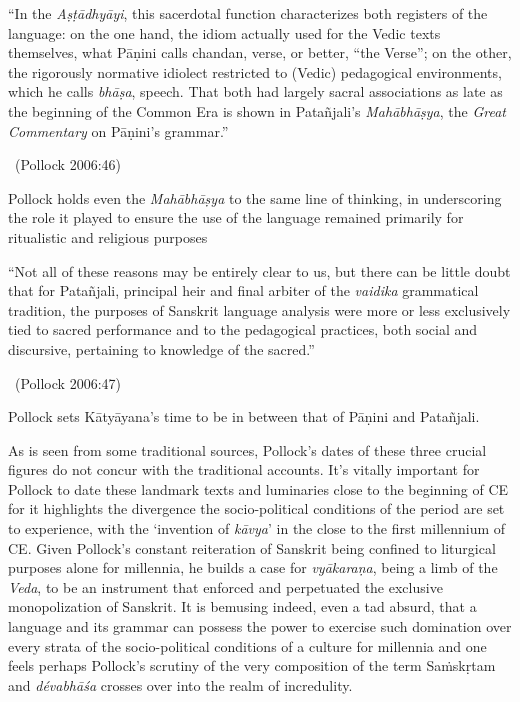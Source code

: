 \begin{myquote}
“In the \textit{Aṣṭādhyāyi}, this sacerdotal function characterizes both registers of the language: on the one hand, the idiom actually used for the Vedic texts themselves, what Pāṇini calls chandan, verse, or better, “the Verse”; on the other, the rigorously normative idiolect restricted to (Vedic) pedagogical environments, which he calls \textit{bhāṣa}, speech. That both had largely sacral associations as late as the beginning of the Common Era is shown in Patañjali’s \textit{Mahābhāṣya}, the \textit{Great Commentary} on Pāṇini’s grammar.” 

~\hfill (Pollock 2006:46)
\end{myquote}

Pollock holds even the \textit{Mahābhāṣya} to the same line of thinking, in underscoring the role it played to ensure the use of the language remained primarily for ritualistic and religious purposes

\begin{myquote}
“Not all of these reasons may be entirely clear to us, but there can be little doubt that for Patañjali, principal heir and final arbiter of the \textit{vaidika} grammatical tradition, the purposes of Sanskrit language analysis were more or less exclusively tied to sacred performance and to the pedagogical practices, both social and discursive, pertaining to knowledge of the sacred.” 

~\hfill (Pollock 2006:47)
\end{myquote}

Pollock sets Kātyāyana’s time to be in between that of Pāṇini and Patañjali.

As is seen from some traditional sources, Pollock’s dates of these three crucial figures do not concur with the traditional accounts. It’s vitally important for Pollock to date these landmark texts and luminaries close to the beginning of CE for it highlights the divergence the socio-political conditions of the period are set to experience, with the ‘invention of \textit{kāvya}’ in the close to the first millennium of CE. Given Pollock’s constant reiteration of Sanskrit being confined to liturgical purposes alone for millennia, he builds a case for \textit{vyākaraṇa}, being a limb of the \textit{Veda}, to be an instrument that enforced and perpetuated the exclusive monopolization of Sanskrit. It is bemusing indeed, even a tad absurd, that a language and its grammar can possess the power to exercise such domination over every strata of the socio-political conditions of a culture for millennia and one feels perhaps Pollock’s scrutiny of the very composition of the term Saṁskṛtam and \textit{dévabhāśa} crosses over into the realm of incredulity.


